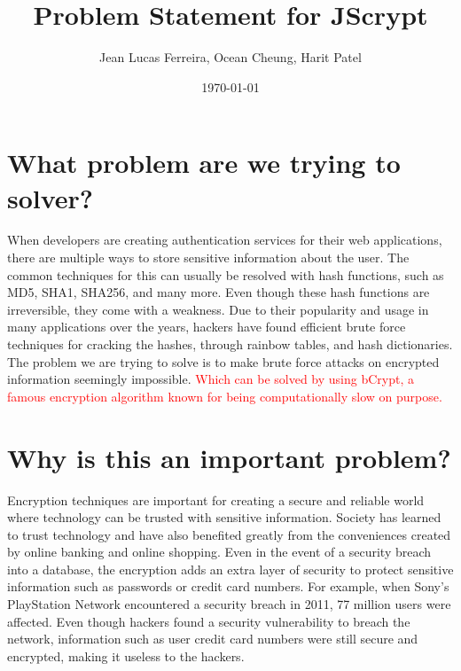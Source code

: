 \documentclass[12pt]{article}
\begin{document}
\title{Problem Statement for JScrypt}
\author{Jean Lucas Ferreira, Ocean Cheung, Harit Patel}

\date{\today}

\maketitle


\newpage
  \tableofcontents

\newpage

\section*{}

\section{What problem are we trying to solver?}
  When developers are creating authentication services for their web applications, there are multiple ways to store sensitive information about the user. The common techniques for this can usually be resolved with hash functions, such as MD5, SHA1, SHA256, and many more. Even though these hash functions are irreversible, they come with a weakness. Due to their popularity and usage in many applications over the years, hackers have found efficient brute force techniques for cracking the hashes, through rainbow tables, and hash dictionaries. The problem we are trying to solve is to make brute force attacks on encrypted information seemingly impossible. \textcolor{red} {Which can be solved by using bCrypt, a famous encryption algorithm known for being computationally slow on purpose.}


\section{Why is this an important problem?}

  Encryption techniques are important for creating a secure and reliable world where technology can be trusted with sensitive information. Society has learned to trust technology and have also benefited greatly from the conveniences created by online banking and online shopping. Even in the event of a security breach into a database, the encryption adds an extra layer of security to protect sensitive information such as passwords or credit card numbers. For example, when Sony’s PlayStation Network encountered a security breach in 2011, 77 million users were affected. Even though hackers found a security vulnerability to breach the network, information such as user credit card numbers were still secure and encrypted, making it useless to the hackers.
\end{document}
